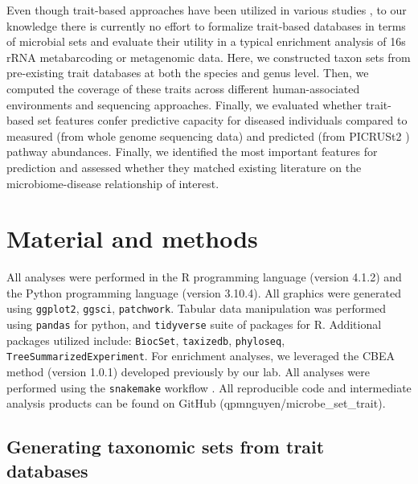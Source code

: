 \documentclass[10pt,letterpaper]{article}
\begin{document}
Even though trait-based approaches have been utilized in various studies \cite{weissman2021exploring, bewick2019traitbased, guittar2019traitbased, krause2014traitbased}, to our knowledge there is currently no effort to formalize trait-based databases in terms of microbial sets and evaluate their utility in a typical enrichment analysis of 16s rRNA metabarcoding or metagenomic data. Here, we constructed taxon sets from pre-existing trait databases at both the species and genus level. Then, we computed the coverage of these traits across different human-associated environments and sequencing approaches. Finally, we evaluated whether trait-based set features confer predictive capacity for diseased individuals compared to measured (from whole genome sequencing data) and predicted (from PICRUSt2 \cite{douglas2020picrust2}) pathway abundances. Finally, we identified the most important features for prediction and assessed whether they matched existing literature on the microbiome-disease relationship of interest.  


\section*{Material and methods} \label{methods}

All analyses were performed in the R programming language (version 4.1.2) \cite{rcoreteam2021language} and the Python programming language (version 3.10.4). All graphics were generated using \texttt{ggplot2}, \texttt{ggsci}, \texttt{patchwork}. Tabular data manipulation was performed using \texttt{pandas} for python, and \texttt{tidyverse} suite of packages for R. Additional packages utilized include: \texttt{BiocSet}, \texttt{taxizedb}, \texttt{phyloseq}, \texttt{TreeSummarizedExperiment}. For enrichment analyses, we leveraged the CBEA \cite{nguyen2021cbea} method (version 1.0.1) developed previously by our lab. All analyses were performed using the \texttt{snakemake} workflow \cite{molder2021sustainable}. All reproducible code and intermediate analysis products can be found on GitHub (qpmnguyen/microbe\_set\_trait).  

\subsection*{Generating taxonomic sets from trait databases}  
\end{document}
